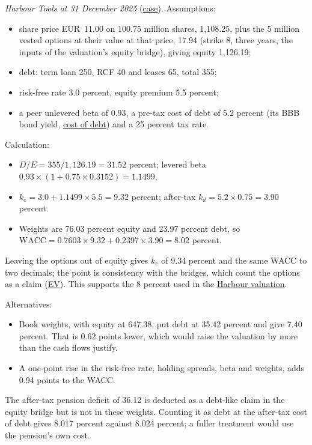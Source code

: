 \begin{qfmethod}
 \emph{Harbour Tools at 31 December 2025} (\hyperref[ex:harbour-tools-statements]{case}). Assumptions:
\begin{itemize}
\item share price EUR~11.00 on 100.75 million shares, 1,108.25, plus the 5 million vested options at their value at that price, 17.94 (strike 8, three years, the inputs of the valuation's equity bridge), giving equity 1,126.19;
\item debt: term loan 250, RCF 40 and leases 65, total 355;
\item risk-free rate 3.0 percent, equity premium 5.5 percent;
\item a peer unlevered beta of 0.93, a pre-tax cost of debt of 5.2 percent (its BBB bond yield, \hyperref[meth:cost-of-debt-equity-estimation]{cost of debt}) and a 25 percent tax rate.
\end{itemize}

Calculation:
\begin{itemize}
\item $D/E=355/1{,}126.19=31.52$ percent; levered beta $0.93\times(1+0.75\times0.3152)=1.1499$.
\item $k_e=3.0+1.1499\times5.5=9.32$ percent; after-tax $k_d=5.2\times0.75=3.90$ percent.
\item Weights are 76.03 percent equity and 23.97 percent debt, so $\mathrm{WACC}=0.7603\times9.32+0.2397\times3.90=8.02$ percent.
\end{itemize}
Leaving the options out of equity gives $k_e$ of 9.34 percent and the same WACC to two decimals; the point is consistency with the bridges, which count the options as a claim (\hyperref[def:price-value-indicators]{EV}).
This supports the 8 percent used in the \hyperref[meth:forecast-horizon-steady-state]{Harbour valuation}.

Alternatives:
\begin{itemize}
\item Book weights, with equity at 647.38, put debt at 35.42 percent and give 7.40 percent. That is 0.62 points lower, which would raise the valuation by more than the cash flows justify.
\item A one-point rise in the risk-free rate, holding spreads, beta and weights, adds 0.94 points to the WACC.
\end{itemize}
The after-tax pension deficit of 36.12 is deducted as a debt-like claim in the equity bridge but is not in these weights. Counting it as debt at the after-tax cost of debt gives 8.017 percent against 8.024 percent; a fuller treatment would use the pension's own cost.


\end{qfmethod}
